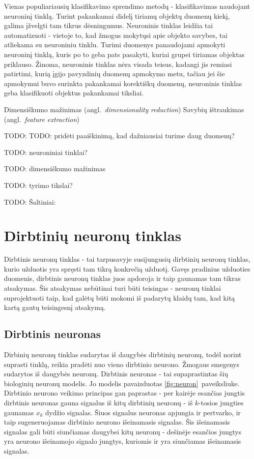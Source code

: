\documentclass{VUMIFPSbakalaurinis}
\newcommand{\TODO}[1]{
\colorbox{todo-background-color}{TODO: #1}
}
\begin{document}
Vienas populiariausių klasifikavimo sprendimo metodų - klasifikavimas naudojant neuroninį tinklą.
Turint pakankamai didelį tiriamų objektų duomenų kiekį, galima įžvelgti tam tikrus dėsningumus.
Neuroninis tinklas leidžia tai automatizuoti - vietoje to, kad žmogus mokytųsi apie objekto savybes, tai atliekama su neuroniniu tinklu.
Turimi duomenys panaudojami apmokyti neuroninį tinklą, kuris po to geba pats pasakyti, kuriai grupei tiriamas objektas priklauso.
Žinoma, neuroninis tinklas nėra visada teisus, kadangi jis remiasi patirtimi, kurią įgijo pavyzdinių duomenų apmokymo metu, tačiau jei šie apmokymui buvo surinkta pakankamai korektiškų duomenų, neuroninis tinklas geba klasifikuoti objektus pakankamai tiksliai.

Dimensiškumo mažinimas (angl.~\textit{dimensionality reduction})
Savybių ištraukimas (angl.~\textit{feature extraction})

\TODO{TODO: pridėti paaiškinimą, kad dažniausiai turime daug duomenų?}

\TODO{neuroniniai tinklai?}
\TODO{dimensiškumo mažinimas}
\TODO{tyrimo tikslai?}


\TODO{Šaltiniai:}

\cite{298007} \cite{857823} \cite{857823} \cite{1007668} \cite{363467}

\section{Dirbtinių neuronų tinklas}

Dirbtinis neuronų tinklas - tai tarpusavyje susijungusių dirbtinių neuronų tinklas, kurio užduotis yra spręsti tam tikrą konkrečią užduotį.
Gavęs pradinius užduoties duomenis, dirbtinis neuronų tinklas juos apdoroja ir taip gaunamas tam tikras atsakymas.
Šis atsakymas nebūtinai turi būti teisingas - neuronų tinklai suprojektuoti taip, kad galėtų būti mokomi iš padarytų klaidų tam, kad kitą kartą gautų teisingesnį atsakymą.

\subsection{Dirbtinis neuronas}

Dirbinių neuronų tinklas sudarytas iš daugybės dirbtinių neuronų, todėl norint suprasti tinklą, reikia pradėti nuo vieno dirbtinio neurono.
Žmogaus smegenys sudarytos iš daugybės neuronų.
Dirbtinis neuronas - tai supaprastintas šių biologinių neuronų modelis.
Jo modelis pavaizduotas \ref{fig:neuron}~paveiksliuke.
Dirbtinio neurono veikimo principas gan paprastas - per kairėje esančias jungtis dirbtinis neuronas gauna signalus iš kitų dirbtinių neuronų - iš $k$-tosios jungties gaunamas $x_k$ dydžio signalas.
Šiuos signalus neuronas apjungia ir pertvarko, ir taip sugeneruojamas dirbtinio neurono išeinamasis signalas.
Šis išeinamasis signalas gali būti siunčiamas daugybei kitų neuronų - dešinėje esančios jungtys yra neurono išeinamojo signalo jungtys, kuriomis ir yra siunčiamas išeinamasis signalas.
\end{document}
